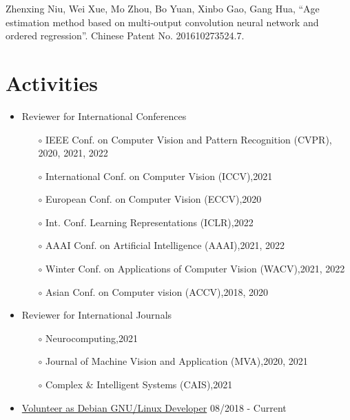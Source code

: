 \documentclass[margin,line,pifont,palatino,courier]{res}
\begin{document}
\begin{resume}
\begin{enumerate}[noitemsep, leftmargin=*, label={[P0{\arabic*}]}]
\item Zhenxing Niu, Wei Xue, Mo Zhou, Bo Yuan, Xinbo Gao, Gang Hua,
	``Age estimation method based on multi-output convolution neural
	network and ordered regression''. Chinese Patent No. 201610273524.7.

\end{enumerate}

\section{\sc Activities}

\begin{itemize}[noitemsep, leftmargin=*]
\item Reviewer for International Conferences
	\begin{itemize}[noitemsep, leftmargin=*]
		\item[$\circ$] IEEE Conf. on Computer Vision and Pattern Recognition (CVPR), \hfill 2020, 2021, 2022
		\item[$\circ$] International Conf. on Computer Vision (ICCV),\hfill 2021
		\item[$\circ$] European Conf. on Computer Vision (ECCV),\hfill 2020
		\item[$\circ$] Int. Conf. Learning Representations (ICLR),\hfill 2022
		\item[$\circ$] AAAI Conf. on Artificial Intelligence (AAAI),\hfill 2021, 2022
		\item[$\circ$] Winter Conf. on Applications of Computer Vision (WACV),\hfill 2021, 2022
		\item[$\circ$] Asian Conf. on Computer vision (ACCV),\hfill 2018, 2020
	\end{itemize}
\item Reviewer for International Journals
	\begin{itemize}[noitemsep, leftmargin=*]
		\item[$\circ$] Neurocomputing,\hfill 2021
		\item[$\circ$] Journal of Machine Vision and Application (MVA),\hfill 2020, 2021
		\item[$\circ$] Complex \& Intelligent Systems (CAIS),\hfill 2021
	\end{itemize}
\item \href{https://nm.debian.org/person/lumin/}{Volunteer as Debian GNU/Linux Developer}
	\hfill 08/2018 - Current\\
\end{itemize}


\end{resume}
\end{document}
